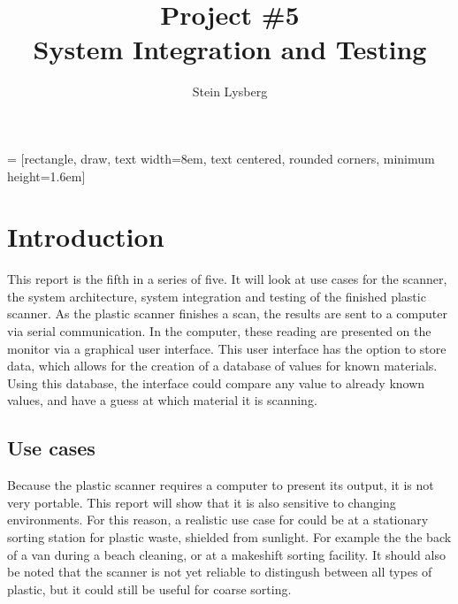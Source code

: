 \documentclass[12pt, a4paper]{article}
\title{
    Project \#5\\
    \large System Integration and Testing\\
}
\author{
    Stein Lysberg
}
\begin{document}
 = [rectangle, draw, text width=8em, text centered, rounded      corners, minimum height=1.6em]


    \maketitle
    \tableofcontents

    \thispagestyle{empty}
    \addtocounter{page}{-1}
    \clearpage

    \section{Introduction}
        
        This report is the fifth in a series of five. It will look at use cases for the scanner, the system architecture,
        system integration and testing of the
        finished plastic scanner. As the plastic scanner finishes a scan, the results are sent to a computer via serial communication. In the computer,
        these reading are presented on the monitor via a graphical user interface. This user interface has the option to store data,
        which allows for the creation of a database of values for known materials. Using this database, the interface could compare any
        value to already known values, and have a guess at which material it is scanning.

        \subsection{Use cases}
        
        Because the plastic scanner requires a computer to present its output, it is not very portable. This report will show that it is also
        sensitive to changing environments. For this reason, a realistic use case for could be at a stationary sorting station for plastic waste, shielded from
        sunlight. For example the the back of a van during a beach cleaning, or at a makeshift sorting facility. It should also be noted that the
        scanner is not yet reliable to distingush between all types of plastic, but it could still be useful for coarse sorting.
\end{document}

